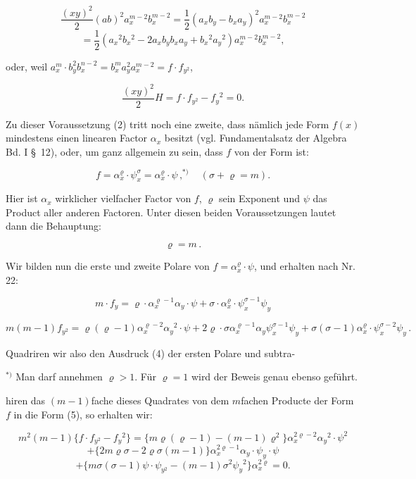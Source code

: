 \documentclass[11pt]{article}
\providecommand{\weberpage}[1]{}
\providecommand{\weq}[2]{\begin{equation}\tag{#1}#2\end{equation}}
\begin{document}
\[
\frac{(xy)^2}{2}(ab)^2 a_x^{m-2}b_x^{m-2} = \frac{1}{2}(a_x b_y - b_x a_y)^2 a_x^{m-2}b_x^{m-2}
\]
\[
= \frac{1}{2}(a_x{}^2 b_x{}^2 - 2a_x b_y b_x a_y + b_x{}^2 a_y{}^2)a_x^{m-2}b_x^{m-2},
\]

oder, weil $a_x^m\cdot b_y^2 b_x^{n-2} = b_x^m a_y^2 a_x^{m-2} = f\cdot f_{y^2}$,

\weq{2}{\frac{(xy)^2}{2}H = f\cdot f_{y^2} - f_y{}^2 = 0.}

Zu dieser Voraussetzung (2) tritt noch eine zweite, dass nämlich jede Form $f(x)$ mindestens einen linearen Factor $\alpha_x$ besitzt (vgl. Fundamentalsatz der Algebra Bd. I \S~12), oder, um ganz allgemein zu sein, dass $f$ von der Form ist:

\weq{3}{f = \alpha_x^{\varrho}\cdot\psi_x^{\sigma} = \alpha_x^{\varrho}\cdot\psi\,,^{*)}\quad(\sigma + \varrho = m).}

Hier ist $\alpha_x$ wirklicher vielfacher Factor von $f$, $\varrho$ sein Exponent und $\psi$ das Product aller anderen Factoren. Unter diesen beiden Voraussetzungen lautet dann die Behauptung:

\[
\varrho = m\,.
\]

Wir bilden nun die erste und zweite Polare von $f = \alpha_x^{\varrho}\cdot\psi$, und erhalten nach Nr. 22:

\weq{4}{m\cdot f_y = \varrho\cdot\alpha_x^{\varrho-1}\alpha_y\cdot\psi + \sigma\cdot\alpha_x^{\varrho}\cdot\psi_x^{\sigma-1}\psi_y}

\weq{5}{m(m-1)f_{y^2} = \varrho(\varrho-1)\alpha_x^{\varrho-2}\alpha_y{}^2\cdot\psi + 2\varrho\cdot\sigma\alpha_x^{\varrho-1}\alpha_y\psi_x^{\sigma-1}\psi_y + \sigma(\sigma-1)\alpha_x^{\varrho}\cdot\psi_x^{\sigma-2}\psi_y\,.}

Quadriren wir also den Ausdruck (4) der ersten Polare und subtra-

\medskip
\noindent{}$^{*)}$ Man darf annehmen $\varrho > 1$. Für $\varrho = 1$ wird der Beweis genau ebenso geführt.


\weberpage{60}
hiren das $(m-1)$fache dieses Quadrates von dem $m$fachen Producte der Form $f$ in die Form (5), so erhalten wir:

\[
m^2(m-1)\{f\cdot f_{y^2} - f_y{}^2\} = \{m\varrho(\varrho-1) - (m-1)\varrho^2\}\alpha_x^{2\varrho-2}\alpha_y{}^2\cdot\psi^2
\]
\[
+ \{2m\varrho\sigma - 2\varrho\sigma(m-1)\}\alpha_x^{2\varrho-1}\alpha_y\cdot\psi_y\cdot\psi
\]
\[
+ \{m\sigma(\sigma-1)\psi\cdot\psi_{y^2} - (m-1)\sigma^2\psi_y{}^2\}\alpha_x^{2\varrho} = 0.
\]
\end{document}
